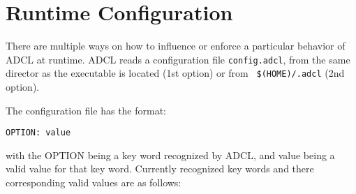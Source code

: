 \section{Runtime Configuration}

There are multiple ways on how to influence or enforce a particular behavior
of ADCL at runtime. ADCL reads a configuration file {\tt config.adcl}, from
the same director as the executable is located (1st option) or from {\tt
  \$(HOME)/.adcl} (2nd option).

The configuration file has the format:
\begin{verbatim}
OPTION: value
\end{verbatim}

with the OPTION being a key word recognized by ADCL, and value being a valid
value for that key word. Currently recognized key words and there
corresponding valid values are as follows:

